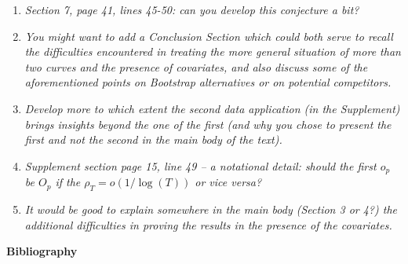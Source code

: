 \documentclass[a4paper,12pt]{article}
\begin{document}
\begin{enumerate}[label=\arabic*.,leftmargin=0.6cm]
\item \textit{Section 7, page 41, lines 45-50: can you develop this conjecture a bit?}


\item \textit{You might want to add a Conclusion Section which could both serve to recall the difficulties encountered in treating the more general situation of more than two curves and the presence of
covariates, and also discuss some of the aforementioned points on Bootstrap alternatives or on potential competitors.}  


\item \textit{Develop more to which extent the second data application (in the Supplement) brings insights beyond the one of the first (and why you chose to present the first and not the second in the main body of the text).}


\item \textit{Supplement section page 15, line 49 -- a notational detail: should the first $o_p$ be $O_p$ if the $\rho_T = o(1/ \log(T))$ or vice versa?}  


\item \textit{It would be good to explain somewhere in the main body (Section 3 or 4?) the additional difficulties in proving the results in the presence of the covariates.}
  
  
\end{enumerate}



\vspace{10pt}

\large\textbf{{Bibliography}}
\renewcommand\refname{}
\vspace{-40pt}
\end{document}
